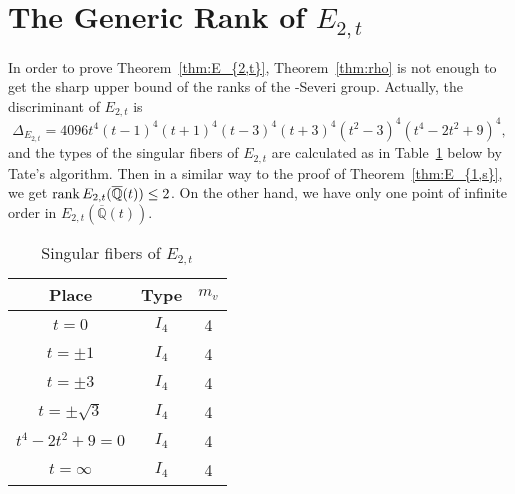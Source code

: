 \documentclass[main]{subfiles}
\begin{document}
\section{The Generic Rank of \texorpdfstring{$E_{2,t}$}{E2,t}}

In order to prove Theorem~\ref{thm:E_{2,t}}, Theorem~\ref{thm:rho} is not enough to get the sharp upper bound of the ranks of the \Neron-Severi group.
Actually, the discriminant of $E_{2,t}$ is
\begin{equation*}
    \Delta_{E_{2,t}} = 4096t^{4}(t - 1)^{4}(t + 1)^{4}(t - 3)^{4}(t + 3)^{4}(t^{2} - 3)^{4}(t^{4} - 2t^{2} + 9)^{4},
\end{equation*}
and the types of the singular fibers of $E_{2,t}$ are calculated as in Table~\ref{tab:E_{2,t}} below by Tate's algorithm.
Then in a similar way to the proof of Theorem~\ref{thm:E_{1,s}}, we get $\operatorname{rank} E_{2,t}(\overline{\mathbb{Q}}(t)) \leq 2$.
On the other hand, we have only one point of infinite order in $E_{2,t}(\overline{\mathbb{Q}}(t))$.
\begin{table}[ht]
    \centering
    \caption{Singular fibers of $E_{2,t}$}
    \begin{tabular}{|c|c|c|}
        \hline
        Place            & Type  & $m_v$ \\
        \hline
        $t=0$            & $I_4$ & 4     \\
        $t=\pm 1$        & $I_4$ & 4     \\
        $t=\pm 3$        & $I_4$ & 4     \\
        $t=\pm \sqrt{3}$ & $I_4$ & 4     \\
        $t^4-2t^2+9=0$   & $I_4$ & 4     \\
        $t=\infty$       & $I_4$ & 4     \\
        \hline
    \end{tabular}
    \label{tab:E_{2,t}}
\end{table}

\end{document}
